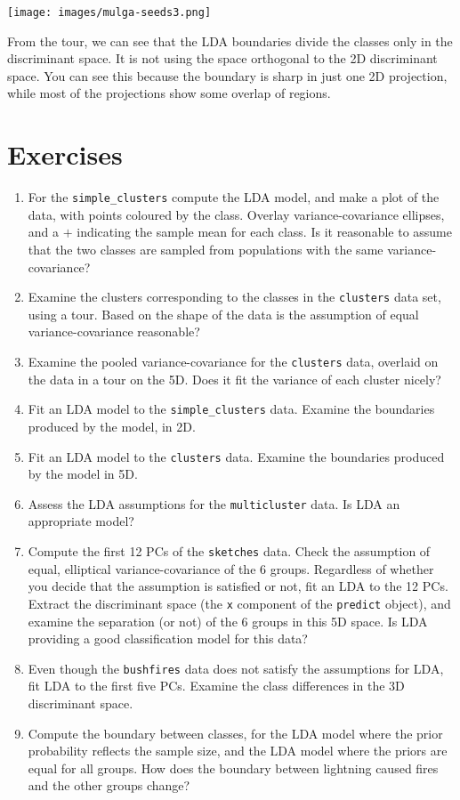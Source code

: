 \documentclass[
  letterpaper,
]{krantz}
\providecommand{\tightlist}{%
  \setlength{\itemsep}{0pt}\setlength{\parskip}{0pt}}\usepackage{longtable,booktabs,array}
\newcommand{\insightbox}[1]{%
\noindent\colorbox{insight!30}{%
\begin{minipage}{0.98\textwidth}%
    \centering%
    \begin{minipage}[c]{0.15\textwidth} %
      \texttt{[image: images/mulga-seeds3.png]} %
    \end{minipage}%
    \hfill %
    \begin{minipage}[c]{0.8\textwidth} %
      \bigskip%
      \textsf{#1}%
      \bigskip%
    \end{minipage}%
    \hspace*{3mm}%
  \end{minipage}%
}%
}
\begin{document}
\insightbox{From the tour, we can see that the LDA boundaries divide the classes only in the discriminant space. It is not using the space orthogonal to the 2D discriminant space. You can see this because the boundary is sharp in just one 2D projection, while most of the projections show some overlap of regions.}

\hypertarget{exercises-7}{%
\section*{Exercises}\label{exercises-7}}


\begin{enumerate}
\def\labelenumi{\arabic{enumi}.}
\tightlist
\item
  For the \texttt{simple\_clusters} compute the LDA model, and make a
  plot of the data, with points coloured by the class. Overlay
  variance-covariance ellipses, and a \(+\) indicating the sample mean
  for each class. Is it reasonable to assume that the two classes are
  sampled from populations with the same variance-covariance?
\item
  Examine the clusters corresponding to the classes in the
  \texttt{clusters} data set, using a tour. Based on the shape of the
  data is the assumption of equal variance-covariance reasonable?
\item
  Examine the pooled variance-covariance for the \texttt{clusters} data,
  overlaid on the data in a tour on the 5D. Does it fit the variance of
  each cluster nicely?
\item
  Fit an LDA model to the \texttt{simple\_clusters} data. Examine the
  boundaries produced by the model, in 2D.
\item
  Fit an LDA model to the \texttt{clusters} data. Examine the boundaries
  produced by the model in 5D.
\item
  Assess the LDA assumptions for the \texttt{multicluster} data. Is LDA
  an appropriate model?
\item
  Compute the first 12 PCs of the \texttt{sketches} data. Check the
  assumption of equal, elliptical variance-covariance of the 6 groups.
  Regardless of whether you decide that the assumption is satisfied or
  not, fit an LDA to the 12 PCs. Extract the discriminant space (the
  \texttt{x} component of the \texttt{predict} object), and examine the
  separation (or not) of the 6 groups in this 5D space. Is LDA providing
  a good classification model for this data?
\item
  Even though the \texttt{bushfires} data does not satisfy the
  assumptions for LDA, fit LDA to the first five PCs. Examine the class
  differences in the 3D discriminant space.
\item
  Compute the boundary between classes, for the LDA model where the
  prior probability reflects the sample size, and the LDA model where
  the priors are equal for all groups. How does the boundary between
  lightning caused fires and the other groups change?
\end{enumerate}
\end{document}
